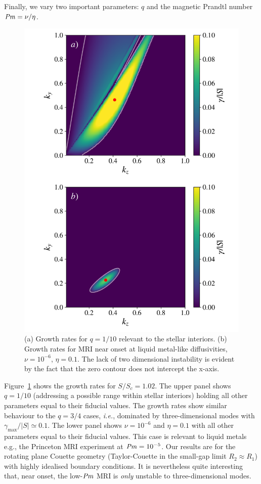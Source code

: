 \documentclass[openacc]{rsproca_new}%
\newcommand{\SSC}{S/S_{c}}
\newcommand{\Prm}{\mbox{\textit{Pm}}}
\begin{document}
Finally, we vary two important parameters:
$q$ and the magnetic Prandtl number $\Prm=\nu/\eta$.
\begin{figure}[h!]
  \centering
  \includegraphics[width=\columnwidth]{low_rossby_liquid_metal_growth_rates.pdf}
  \caption{(a) Growth rates for $q=1/10$ relevant to the stellar interiors. 
  (b) Growth rates for MRI near onset at liquid metal-like diffusivities, $\nu=10^{-6}$, $\eta=0.1$.
The lack of two dimensional instability is evident by the fact that the zero contour does not intercept the x-axis.}
  \label{fig:other_params}
\end{figure}
Figure~\ref{fig:other_params} shows the growth rates for $\SSC=1.02$.
The upper panel shows $q=1/10$ (addressing a possible range within stellar interiors) holding all other parameters equal to their fiducial values.
The growth rates show similar behaviour to the $q=3/4$ cases, \textit{i.e.}, dominated by three-dimensional modes with $\gamma_{\max}/|S|\simeq0.1$.
The lower panel shows $\nu=10^{-6}$ and $\eta=0.1$ with all other parameters equal to their fiducial values. 
This case is relevant to liquid metals e.g., the Princeton MRI experiment \cite{2002JFM...462..365G}
at $\Prm=10^{-5}$. 
Our results are for the rotating plane Couette geometry (Taylor-Couette in the small-gap limit $R_{2}\approx{R}_{1}$) with highly idealised boundary conditions.
It is nevertheless quite interesting that, near onset, the low-$\Prm$ MRI is \emph{only} unstable to three-dimensional modes.
\end{document}

